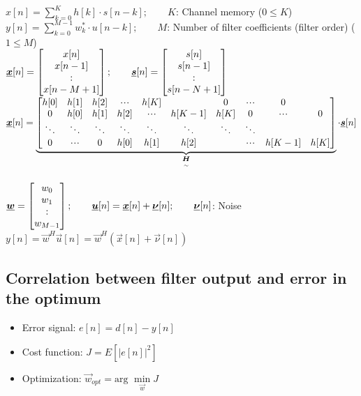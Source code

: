 $x[n]=\sum\limits_{k=0}^{K} h[k] \cdot s[n-k]; \qquad K$: Channel memory ($0\leq K$)\\
$y[n]=\sum\limits_{k=0}^{M-1} w_k^* \cdot u[n-k]; \qquad M$: Number of filter coefficients (filter order) ($1\leq M$)\\

$\underline{\boldsymbol {x}}[n] = \begin{bmatrix} x[n]\\ x[n-1]\\ : \\ x[n-M+1] \end{bmatrix}; \qquad \underline{\boldsymbol {s}}[n]= \begin{bmatrix} s[n]\\ s[n-1]\\ : \\ s[n-N+1] \end{bmatrix}$\\

$\vec{x}[n] = \underbrace{\mat{h[0] & h[1] & h[2] & \shdots & h[K] & & 0 & \shdots & 0\\
													0 & h[0] & h[1] & h[2] & \shdots & h[K-1] & h[K] & 0 & \shdots & 0\\
													\ddots & \ddots & \ddots & \ddots & \ddots & \ddots & \ddots & \ddots & &\\
													0 & \shdots & 0 & h[0] & h[1] & h[2] & &\shdots & h[K-1] & h[K]}}_{\ma{H}} \cdot \vec{s}[n]$\\
 \\

$\underline{\boldsymbol {w}} = \begin{bmatrix} w_0\\ w_1\\ : \\w_{M-1} \end{bmatrix}; \qquad \underline{\boldsymbol {u}}[n]=\underline{\boldsymbol {x}}[n] + \underline{\boldsymbol {\nu}}[n]; \qquad \underline{\boldsymbol {\nu}}[n]$: Noise\\
$y[n] = \vec{w}^H \vec{u}[n] = \vec{w}^H(\vec{x}[n] + \vec{\nu}[n])$\\
\subsection{Correlation between filter output and error in the optimum}
\begin{itemize}
	\item Error signal: $e[n]=d[n] - y[n]$
	\item Cost function: $J=E[|e[n]|^2]$
	\item Optimization: $\vec{w}_{opt} = \text{arg } \min\limits_{\vec{w}} J$
\end{itemize}

